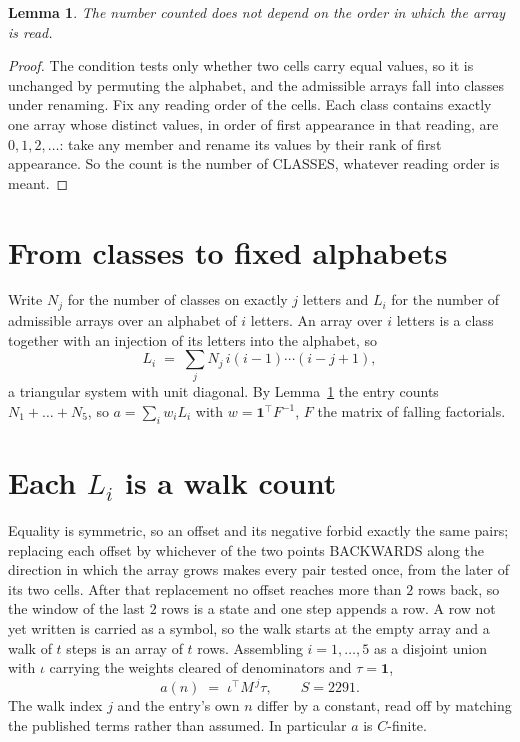 \documentclass[11pt,a4paper]{article}
\theoremstyle{plain}
\newtheorem{lemma}[theorem]{Lemma}
\theoremstyle{definition}
\begin{document}
\begin{lemma}\label{lem:order}
The number counted does not depend on the order in which the array is read.
\end{lemma}

\begin{proof}
The condition tests only whether two cells carry equal values, so it is unchanged by permuting
the alphabet, and the admissible arrays fall into classes under renaming. Fix any reading order
of the cells. Each class contains exactly one array whose distinct values, in order of first
appearance in that reading, are $0,1,2,\dots$: take any member and rename its values by their
rank of first appearance. So the count is the number of CLASSES, whatever reading order is
meant.
\end{proof}

\section{From classes to fixed alphabets}

Write $N_j$ for the number of classes on exactly $j$ letters and $L_i$ for the number of
admissible arrays over an alphabet of $i$ letters. An array over $i$ letters is a class together
with an injection of its letters into the alphabet, so
\[
L_i\;=\;\sum_j N_j\,i(i-1)\cdots(i-j+1),
\]
a triangular system with unit diagonal. By Lemma~\ref{lem:order} the entry counts
$N_1+\dots+N_{5}$, so $a=\sum_i w_iL_i$ with $w=\mathbf{1}^{\!\top}F^{-1}$, $F$ the
matrix of falling factorials.

\section{Each $L_i$ is a walk count}

Equality is symmetric, so an offset and its negative forbid exactly the same pairs; replacing
each offset by whichever of the two points BACKWARDS along the direction in which the array
grows makes every pair tested once, from the later of its two cells. After that replacement no
offset reaches more than $2$ rows back, so the window of the last $2$
rows is a state and one step appends a row. A row not yet written is
carried as a symbol, so the walk starts at the empty array and a walk of $t$ steps is an array
of $t$ rows. Assembling $i=1,\dots,5$ as a disjoint union with $\iota$ carrying the
weights cleared of denominators and $\tau=\mathbf{1}$,
\[
a(n)\;=\;\iota^{\!\top}M^{\,j}\tau ,\qquad S=2291.
\]
The walk index $j$ and the entry's own $n$ differ by a constant, read off by matching the
published terms rather than assumed. In particular $a$ is $C$-finite.
\end{document}
